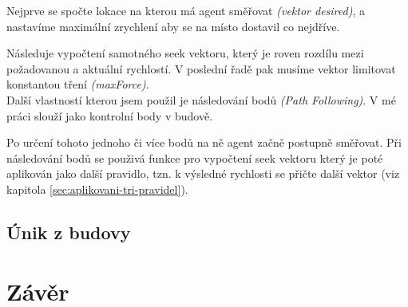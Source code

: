 \documentclass[czech,public,dept460,male,cpdeclaration]{diploma}
\begin{document}
Nejprve se spočte lokace na kterou má agent směřovat \textit{(vektor desired)}, a nastavíme maximální zrychlení aby se na místo dostavil co nejdříve.

Následuje vypočtení samotného seek vektoru, který je roven rozdílu mezi požadovanou a aktuální rychlostí. V poslední řadě pak musíme vektor limitovat konstantou tření \textit{(maxForce)}.
\\

Další vlastností kterou jsem použil je následování bodů \textit{(Path Following)}. V mé práci slouží jako kontrolní body v budově.

Po určení tohoto jednoho či více bodů na ně agent začně postupně směřovat. Při následování bodů se použivá funkce pro vypočtení seek vektoru který je poté aplikován jako další pravidlo, tzn. k výsledné rychlosti se přičte další vektor (viz kapitola \ref{sec:aplikovani-tri-pravidel}).

\subsection{Únik z budovy}


\section{Závěr}
\end{document}
